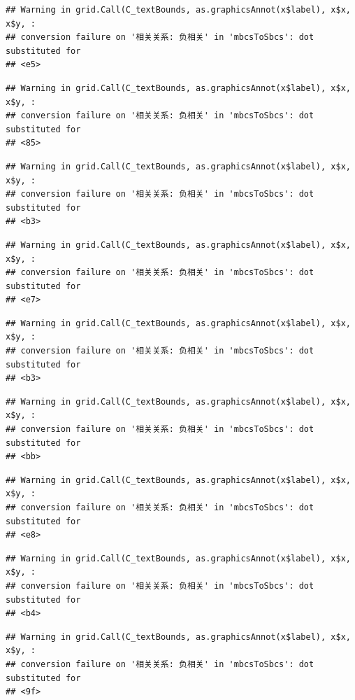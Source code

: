 \documentclass[
]{book}
\begin{document}
\begin{verbatim}
## Warning in grid.Call(C_textBounds, as.graphicsAnnot(x$label), x$x, x$y, :
## conversion failure on '相关关系: 负相关' in 'mbcsToSbcs': dot substituted for
## <e5>
\end{verbatim}

\begin{verbatim}
## Warning in grid.Call(C_textBounds, as.graphicsAnnot(x$label), x$x, x$y, :
## conversion failure on '相关关系: 负相关' in 'mbcsToSbcs': dot substituted for
## <85>
\end{verbatim}

\begin{verbatim}
## Warning in grid.Call(C_textBounds, as.graphicsAnnot(x$label), x$x, x$y, :
## conversion failure on '相关关系: 负相关' in 'mbcsToSbcs': dot substituted for
## <b3>
\end{verbatim}

\begin{verbatim}
## Warning in grid.Call(C_textBounds, as.graphicsAnnot(x$label), x$x, x$y, :
## conversion failure on '相关关系: 负相关' in 'mbcsToSbcs': dot substituted for
## <e7>
\end{verbatim}

\begin{verbatim}
## Warning in grid.Call(C_textBounds, as.graphicsAnnot(x$label), x$x, x$y, :
## conversion failure on '相关关系: 负相关' in 'mbcsToSbcs': dot substituted for
## <b3>
\end{verbatim}

\begin{verbatim}
## Warning in grid.Call(C_textBounds, as.graphicsAnnot(x$label), x$x, x$y, :
## conversion failure on '相关关系: 负相关' in 'mbcsToSbcs': dot substituted for
## <bb>
\end{verbatim}

\begin{verbatim}
## Warning in grid.Call(C_textBounds, as.graphicsAnnot(x$label), x$x, x$y, :
## conversion failure on '相关关系: 负相关' in 'mbcsToSbcs': dot substituted for
## <e8>
\end{verbatim}

\begin{verbatim}
## Warning in grid.Call(C_textBounds, as.graphicsAnnot(x$label), x$x, x$y, :
## conversion failure on '相关关系: 负相关' in 'mbcsToSbcs': dot substituted for
## <b4>
\end{verbatim}

\begin{verbatim}
## Warning in grid.Call(C_textBounds, as.graphicsAnnot(x$label), x$x, x$y, :
## conversion failure on '相关关系: 负相关' in 'mbcsToSbcs': dot substituted for
## <9f>
\end{verbatim}
\end{document}
